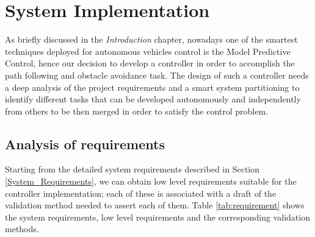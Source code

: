 \section{System Implementation} \label{system_partitioning}
As briefly discussed in the \textit{Introduction} chapter, nowadays one of the smartest techniques deployed for autonomous vehicles control is the Model Predictive Control, hence our decision to develop a controller in order to accomplish the path following and obstacle avoidance task.
The design of such a controller needs a deep analysis of the project requirements and a smart system partitioning to identify different tasks that can be developed autonomously and independently from others to be then merged in order to satisfy the control problem.


\subsection{Analysis of requirements}
Starting from the detailed system requirements described in Section \ref{System_Requirements}, we can obtain low level requirements suitable for the controller implementation; each of these is associated with a draft of the validation method needed to assert each of them. Table \ref{tab:requirement} shows the system requirements, low level requirements and the corresponding validation methods.

